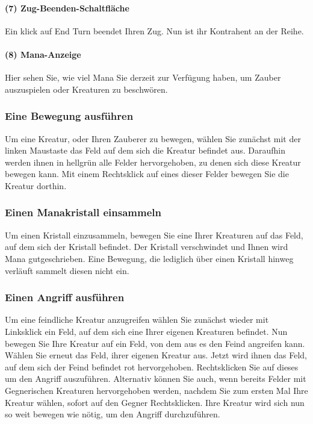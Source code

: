 \documentclass[a4paper,12pt]{scrartcl}
\begin{document}
	\paragraph{(7) Zug-Beenden-Schaltfläche}
	Ein klick auf \glqq End Turn\grqq\hspace{0.05em} beendet Ihren Zug. Nun ist ihr Kontrahent an der Reihe.
	
	\paragraph{(8) Mana-Anzeige}
	Hier sehen Sie, wie viel Mana Sie derzeit zur Verfügung haben, um Zauber auszuspielen oder Kreaturen zu beschwören.
	
	\subsubsection{Eine Bewegung ausführen}
	Um eine Kreatur, oder Ihren Zauberer zu bewegen, wählen Sie zunächst mit der linken Maustaste das Feld auf dem sich die Kreatur befindet aus.
	Daraufhin werden ihnen in hellgrün alle Felder hervorgehoben, zu denen sich diese Kreatur bewegen kann.
	Mit einem Rechtsklick auf eines dieser Felder bewegen Sie die Kreatur dorthin.
	
	\subsubsection{Einen Manakristall einsammeln}
	Um einen Kristall einzusammeln, bewegen Sie eine Ihrer Kreaturen auf das Feld, auf dem sich der Kristall befindet.
	Der Kristall verschwindet und Ihnen wird Mana gutgeschrieben.
	Eine Bewegung, die lediglich über einen Kristall hinweg verläuft sammelt diesen nicht ein.
	
	\subsubsection{Einen Angriff ausführen}
	Um eine feindliche Kreatur anzugreifen wählen Sie zunächst wieder mit Linksklick ein Feld, auf dem sich eine Ihrer eigenen Kreaturen befindet.
	Nun bewegen Sie Ihre Kreatur auf ein Feld, von dem aus es den Feind angreifen kann. 
	Wählen Sie erneut das Feld, ihrer eigenen Kreatur aus. Jetzt wird ihnen das Feld, auf dem sich der Feind befindet rot hervorgehoben. 
	Rechtsklicken Sie auf dieses um den Angriff auszuführen.
	Alternativ können Sie auch, wenn bereits Felder mit Gegnerischen Kreaturen hervorgehoben werden, nachdem Sie zum ersten Mal Ihre Kreatur wählen, sofort auf den Gegner Rechtsklicken. Ihre Kreatur wird sich nun so weit bewegen wie nötig, um den Angriff durchzuführen. 
\end{document}
